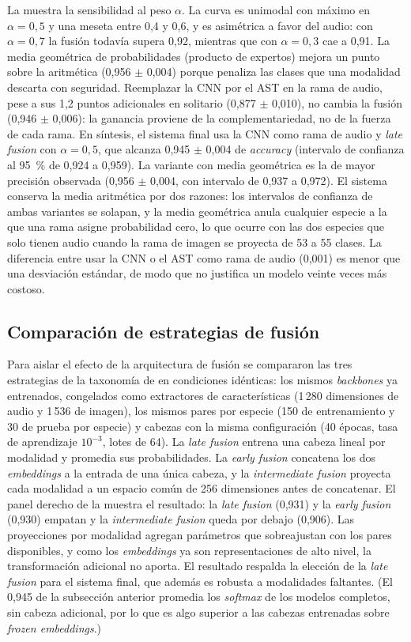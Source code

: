 La  muestra la sensibilidad al peso $\alpha$. La
curva es unimodal con máximo en $\alpha = 0{,}5$ y una meseta entre 0,4 y
0,6, y es asimétrica a favor del audio: con $\alpha = 0{,}7$ la fusión
todavía supera 0,92, mientras que con $\alpha = 0{,}3$ cae a 0,91. La media
geométrica de probabilidades (producto de expertos) mejora un punto sobre la
aritmética (0,956 $\pm$ 0,004) porque penaliza las clases que una modalidad
descarta con seguridad. Reemplazar la CNN por el AST en la rama de audio,
pese a sus 1,2 puntos adicionales en solitario (0,877 $\pm$ 0,010), no cambia
la fusión (0,946 $\pm$ 0,006): la ganancia proviene de la complementariedad,
no de la fuerza de cada rama. En síntesis, el sistema final usa la CNN como
rama de audio y \textit{late fusion} con $\alpha = 0{,}5$, que alcanza
0,945 $\pm$ 0,004 de \textit{accuracy} (intervalo de confianza al
\SI{95}{\percent} de 0,924 a 0,959). La variante con media geométrica es la
de mayor precisión observada (0,956 $\pm$ 0,004, con intervalo de 0,937 a
0,972). El sistema conserva la media aritmética por dos razones: los
intervalos de confianza de ambas variantes se solapan, y la media geométrica
anula cualquier especie a la que una rama asigne probabilidad cero, lo que
ocurre con las dos especies que solo tienen audio cuando la rama de imagen se
proyecta de 53 a 55 clases. La
diferencia entre usar la CNN o el AST como rama de audio (0,001) es menor
que una desviación estándar, de modo que no justifica un modelo veinte veces
más costoso.

\subsection{Comparación de estrategias de fusión}

Para aislar el efecto de la arquitectura de fusión se compararon las tres
estrategias de la taxonomía de \citet{baltrusaitis2019multimodal} en
condiciones idénticas: los mismos \textit{backbones} ya entrenados,
congelados como extractores de características (1\,280 dimensiones de audio y
1\,536 de imagen), los mismos pares por especie (150 de entrenamiento y 30 de
prueba por especie) y cabezas con la misma configuración (40 épocas, tasa de
aprendizaje $10^{-3}$, lotes de 64). La \textit{late fusion} entrena una cabeza
lineal por modalidad y promedia sus probabilidades. La \textit{early fusion}
concatena los dos \textit{embeddings} a la entrada de una única cabeza, y la
\textit{intermediate fusion} proyecta cada modalidad a un espacio común de 256
dimensiones antes de concatenar. El panel derecho de la 
muestra el resultado: la \textit{late fusion} (0,931) y la
\textit{early fusion} (0,930) empatan y la \textit{intermediate fusion} queda
por debajo
(0,906). Las proyecciones por modalidad agregan parámetros que sobreajustan
con los pares disponibles, y como los \textit{embeddings} ya son
representaciones de alto nivel, la transformación adicional no aporta. El
resultado respalda la elección de la \textit{late fusion} para el sistema final,
que además es robusta a modalidades faltantes. (El 0,945 de la subsección
anterior promedia los \textit{softmax} de los modelos completos, sin cabeza
adicional, por lo que es algo superior a las cabezas entrenadas sobre
\textit{frozen embeddings}.)

